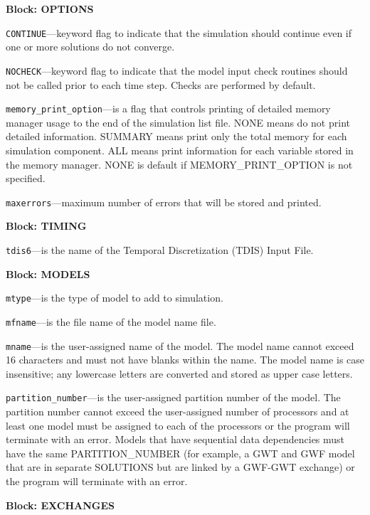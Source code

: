 
\item \textbf{Block: OPTIONS}

\begin{description}
\item \texttt{CONTINUE}---keyword flag to indicate that the simulation should continue even if one or more solutions do not converge.

\item \texttt{NOCHECK}---keyword flag to indicate that the model input check routines should not be called prior to each time step. Checks are performed by default.

\item \texttt{memory\_print\_option}---is a flag that controls printing of detailed memory manager usage to the end of the simulation list file.  NONE means do not print detailed information. SUMMARY means print only the total memory for each simulation component. ALL means print information for each variable stored in the memory manager. NONE is default if MEMORY\_PRINT\_OPTION is not specified.

\item \texttt{maxerrors}---maximum number of errors that will be stored and printed.

\end{description}
\item \textbf{Block: TIMING}

\begin{description}
\item \texttt{tdis6}---is the name of the Temporal Discretization (TDIS) Input File.

\end{description}
\item \textbf{Block: MODELS}

\begin{description}
\item \texttt{mtype}---is the type of model to add to simulation.

\item \texttt{mfname}---is the file name of the model name file.

\item \texttt{mname}---is the user-assigned name of the model.  The model name cannot exceed 16 characters and must not have blanks within the name.  The model name is case insensitive; any lowercase letters are converted and stored as upper case letters.

\item \texttt{partition\_number}---is the user-assigned partition number of the model.  The partition number cannot exceed the user-assigned number of processors and at least one model must be assigned to each of the processors or the program will terminate with an error.  Models that have sequential data dependencies must have the same PARTITION\_NUMBER (for example, a GWT and GWF model that are in separate SOLUTIONS but are linked by a GWF-GWT exchange) or the program will terminate with an error.

\end{description}
\item \textbf{Block: EXCHANGES}

